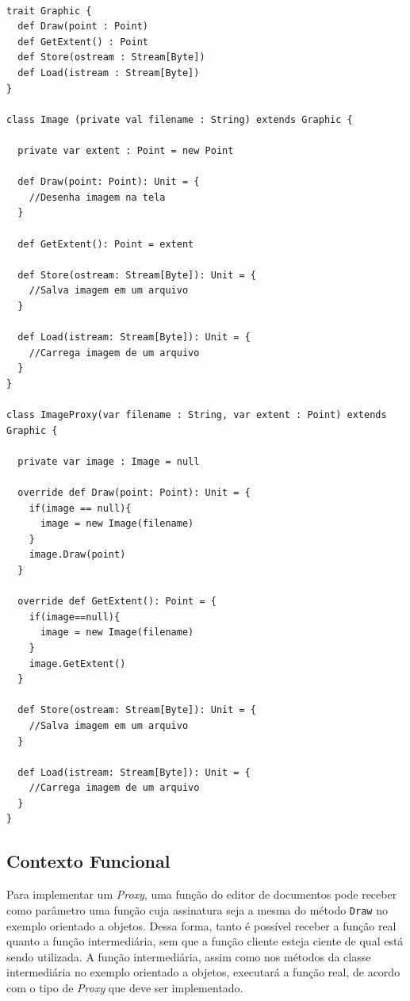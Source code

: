 \begin{lstlisting}[caption={\textit{Proxy} Orientado a Objetos.},label=ooproxy]

trait Graphic {
  def Draw(point : Point)
  def GetExtent() : Point
  def Store(ostream : Stream[Byte])
  def Load(istream : Stream[Byte])
}

class Image (private val filename : String) extends Graphic {

  private var extent : Point = new Point

  def Draw(point: Point): Unit = {
    //Desenha imagem na tela
  }

  def GetExtent(): Point = extent

  def Store(ostream: Stream[Byte]): Unit = {
    //Salva imagem em um arquivo
  }

  def Load(istream: Stream[Byte]): Unit = {
    //Carrega imagem de um arquivo
  }
}

class ImageProxy(var filename : String, var extent : Point) extends Graphic {

  private var image : Image = null

  override def Draw(point: Point): Unit = {
    if(image == null){
      image = new Image(filename)
    }
    image.Draw(point)
  }

  override def GetExtent(): Point = {
    if(image==null){
      image = new Image(filename)
    }
    image.GetExtent()
  }

  def Store(ostream: Stream[Byte]): Unit = {
    //Salva imagem em um arquivo
  }

  def Load(istream: Stream[Byte]): Unit = {
    //Carrega imagem de um arquivo
  }
}

\end{lstlisting}

\subsection*{Contexto Funcional}

Para implementar um \textit{Proxy}, uma função do 
editor de documentos pode receber como 
parâmetro uma função cuja assinatura seja 
a mesma do método \texttt{Draw} no exemplo orientado 
a objetos. Dessa forma, tanto é possível 
receber a função real quanto a função 
intermediária, sem que a função cliente 
esteja ciente de qual está sendo utilizada. 
A função intermediária, assim como nos 
métodos da classe intermediária no exemplo 
orientado a objetos, executará a função 
real, de acordo com o tipo de \textit{Proxy} que 
deve ser implementado. 


